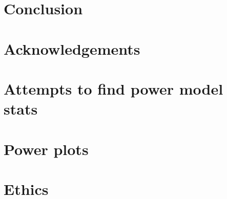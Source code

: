 \documentclass[12pt]{report}
\begin{document}
    \chapter{Conclusion}
    
    
    \chapter*{Acknowledgements}
    
    
    \printbibliography
    
    \appendix
    
    \chapter{Attempts to find power model stats}\label{ch:power-model-eldritch}
    
    
    \chapter{Power plots}\label{ch:power-plots}
    
    
    \chapter{Ethics}
    
\end{document}
